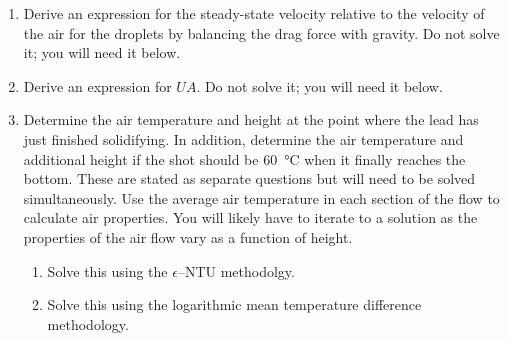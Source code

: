 \documentclass[12pt,letterpaper]{article}
\begin{document}
\begin{enumerate}
        \begin{enumerate}
            \item Derive an expression for the steady-state velocity relative to the velocity of the air for the droplets by balancing the drag force with gravity.
                Do not solve it; you will need it below.
            \item Derive an expression for $UA$.
                Do not solve it; you will need it below.
            \item Determine the air temperature and height at the point where the lead has just finished solidifying.
                In addition, determine the air temperature and additional height if the shot should be \SI{60}{\celsius} when it finally reaches the bottom.
                These are stated as separate questions but will need to be solved simultaneously.
                Use the average air temperature in each section of the flow to calculate air properties.
                You will likely have to iterate to a solution as the properties of the air flow vary as a function of height.
                \begin{enumerate}
                    \item Solve this using the $\epsilon$--NTU methodolgy.
                    \item Solve this using the logarithmic mean temperature difference methodology.
                \end{enumerate}
        \end{enumerate}
\end{enumerate}
\end{document}
